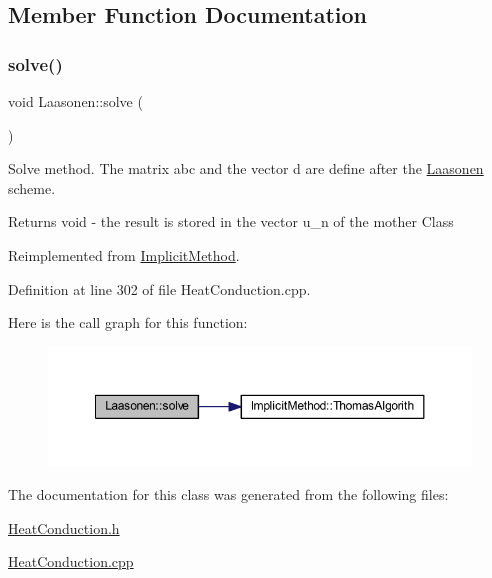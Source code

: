 \subsection{Member Function Documentation}
\mbox{\label{class_laasonen_a53cf5a72691175df0b3b6bdcbfee8c9b}} 
\subsubsection{\texorpdfstring{solve()}{solve()}}
{\footnotesize\ttfamily void Laasonen\+::solve (\begin{DoxyParamCaption}{ }\end{DoxyParamCaption})\hspace{0.3cm}{\ttfamily [virtual]}}



Solve method. The matrix abc and the vector d are define after the \hyperlink{class_laasonen}{Laasonen} scheme. 

\begin{DoxyReturn}{Returns}
void -\/ the result is stored in the vector u\+\_\+n of the mother Class 
\end{DoxyReturn}


Reimplemented from \hyperlink{class_implicit_method_ae06909ac3cde1ae9fb216501c852e22c}{Implicit\+Method}.



Definition at line 302 of file Heat\+Conduction.\+cpp.

Here is the call graph for this function\+:\nopagebreak
\begin{figure}[H]
\begin{center}
\leavevmode
\includegraphics[width=350pt]{class_laasonen_a53cf5a72691175df0b3b6bdcbfee8c9b_cgraph}
\end{center}
\end{figure}


The documentation for this class was generated from the following files\+:\begin{DoxyCompactItemize}
\item 
\hyperlink{_heat_conduction_8h}{Heat\+Conduction.\+h}\item 
\hyperlink{_heat_conduction_8cpp}{Heat\+Conduction.\+cpp}\end{DoxyCompactItemize}
